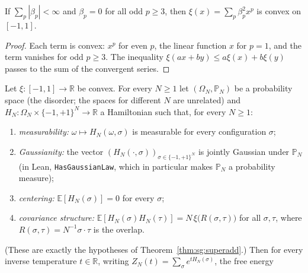 \begin{lemma}[Convexity of $\xi$]\label{lem:sg:convexxi}
  \leanok
If $\sum_p|\beta_p|<\infty$ and $\beta_p=0$ for all odd $p\ge3$, then $\xi(x)=\sum_p\beta_p^2x^p$ is convex on $[-1,1]$.
\end{lemma}

\begin{proof}
  \leanok
Each term is convex: $x^p$ for even $p$, the linear function $x$ for $p=1$, and the term vanishes for odd $p\ge3$. The inequality
$\xi(ax+by)\le a\xi(x)+b\xi(y)$ passes to the sum of the convergent series.
\end{proof}

\begin{theorem}\label{thm:sg:thermolimit}
  \leanok
Let $\xi:[-1,1]\to\mathbb R$ be convex. For every $N\ge1$ let $(\Omega_N,\mathbb P_N)$ be a probability space (the disorder; the spaces for different $N$ are unrelated) and
$H_N:\Omega_N\times\{-1,+1\}^N\to\mathbb R$ a Hamiltonian such that, for every $N\ge1$:
\begin{enumerate}
\item[(i)] \emph{measurability:} $\omega\mapsto H_N(\omega,\sigma)$ is measurable for every configuration $\sigma$;
\item[(ii)] \emph{Gaussianity:} the vector $(H_N(\cdot,\sigma))_{\sigma\in\{-1,+1\}^N}$ is jointly Gaussian under $\mathbb P_N$ (in Lean, \texttt{HasGaussianLaw}, which in particular makes $\mathbb P_N$ a probability measure);
\item[(iii)] \emph{centering:} $\mathbb E[H_N(\sigma)]=0$ for every $\sigma$;
\item[(iv)] \emph{covariance structure:} $\mathbb E[H_N(\sigma)H_N(\tau)]=N\,\xi\big(R(\sigma,\tau)\big)$ for all $\sigma,\tau$, where $R(\sigma,\tau)=N^{-1}\sigma\cdot\tau$ is the overlap.
\end{enumerate}
(These are exactly the hypotheses of Theorem~\ref{thm:sg:superadd}.) Then for every inverse temperature $t\in\mathbb R$, writing $Z_N(t)=\sum_\sigma e^{tH_N(\sigma)}$, the free energy

\end{theorem}
